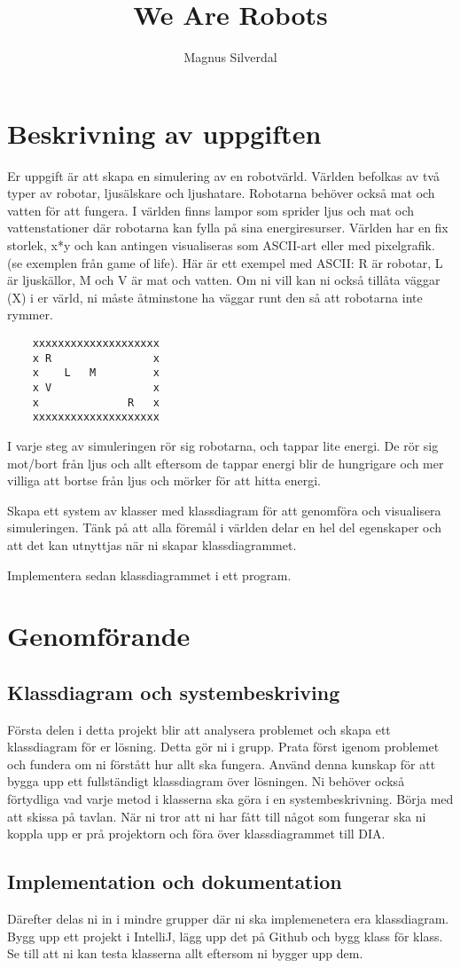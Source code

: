 \documentclass[11pt]{article}
\title{We Are Robots}
\author{Magnus Silverdal}
\begin{document}
    \maketitle
    \newpage
    \section{Beskrivning av uppgiften}
    Er uppgift är att skapa en simulering av en robotvärld. Världen befolkas av två typer av robotar, ljusälskare och ljushatare.
    Robotarna behöver också mat och vatten för att fungera. I världen finns lampor som sprider ljus och mat och vattenstationer
    där robotarna kan fylla på sina energiresurser. Världen har en fix storlek, x*y och kan antingen visualiseras som ASCII-art
    eller med pixelgrafik. (se exemplen från game of life).  Här är ett exempel med ASCII:
    R är robotar, L är ljuskällor, M och V är mat och vatten. Om ni vill kan ni också tillåta väggar (X) i er värld, ni måste
    åtminstone ha väggar runt den så att robotarna inte rymmer.
    \begin{verbatim}
    xxxxxxxxxxxxxxxxxxxx
    x R                x
    x    L   M         x
    x V                x
    x              R   x
    xxxxxxxxxxxxxxxxxxxx
    \end{verbatim}
    I varje steg av simuleringen rör sig robotarna, och tappar lite energi. De rör sig mot/bort från ljus och allt eftersom
    de tappar energi blir de hungrigare och mer villiga att bortse från ljus och mörker för att hitta energi.

    Skapa ett system av klasser med klassdiagram för att genomföra och visualisera simuleringen. Tänk på att alla föremål i
    världen delar en hel del egenskaper och att det kan utnyttjas när ni skapar klassdiagrammet.

    Implementera sedan klassdiagrammet i ett program.

    \section{Genomförande}
    \subsection{Klassdiagram och systembeskriving}
    Första delen i detta projekt blir att analysera problemet och skapa ett klassdiagram för er lösning. Detta gör ni i grupp.
    Prata först igenom problemet och fundera om ni förstått hur allt ska fungera. Använd denna kunskap för att bygga upp ett
    fullständigt klassdiagram över lösningen. Ni behöver också förtydliga vad varje metod i klasserna ska göra i en systembeskrivning.
    Börja med att skissa på tavlan. När ni tror att ni har fått till något som fungerar ska ni koppla upp er prå projektorn
    och föra över klassdiagrammet till DIA.
    \subsection{Implementation och dokumentation}
    Därefter delas ni in i mindre grupper där ni ska implemenetera era klassdiagram. Bygg upp ett projekt i IntelliJ,
    lägg upp det på Github och bygg klass för klass. Se till att ni kan testa klasserna allt eftersom ni bygger upp dem.
\end{document}
